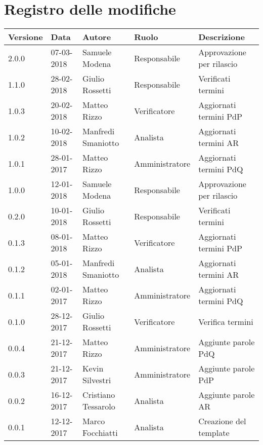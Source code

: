 \documentclass[./AnalisideiRequisiti.tex]{subfiles}
\begin{document}
	
{
	\chapter*{Registro delle modifiche}
\setlength\LTleft{-22mm}
	\begin{longtable}{|p{20mm}|p{20mm}|p{40mm}|p{30mm}|p{50mm}|}
		\hline
		\textbf{Versione} & \textbf{Data} & \textbf{Autore} & \textbf{Ruolo} & \textbf{Descrizione} \\ \hline 
		2.0.0 & 07-03-2018 & Samuele Modena & Responsabile & Approvazione per rilascio\\ \hline
		1.1.0 & 28-02-2018 & Giulio Rossetti & Responsabile & Verificati termini\\ \hline
		
		1.0.3 & 20-02-2018 & Matteo Rizzo & Verificatore & Aggiornati termini PdP\\ \hline
		1.0.2 & 10-02-2018 & Manfredi Smaniotto & Analista & Aggiornati termini AR \\ \hline		
		1.0.1 & 28-01-2017 & Matteo Rizzo & Amministratore & Aggiornati termini PdQ\\
		\hline 
		1.0.0 & 12-01-2018 & Samuele Modena & Responsabile & Approvazione per rilascio\\ \hline
		0.2.0 & 10-01-2018 & Giulio Rossetti & Responsabile & Verificati termini\\ \hline
	
		0.1.3 & 08-01-2018 & Matteo Rizzo & Verificatore & Aggiornati termini PdP\\ \hline
		0.1.2 & 05-01-2018 & Manfredi Smaniotto & Analista & Aggiornati termini AR \\ \hline		
		0.1.1 & 02-01-2017 & Matteo Rizzo & Amministratore & Aggiornati termini PdQ\\ \hline	
	   	0.1.0 & 28-12-2017 & Giulio Rossetti & Verificatore & Verifica termini\\ \hline		
		0.0.4 & 21-12-2017 & Matteo Rizzo & Amministratore & Aggiunte parole PdQ \\ \hline
		0.0.3 & 21-12-2017 & Kevin Silvestri & Amministratore & Aggiunte parole PdP \\ \hline
		0.0.2 & 16-12-2017 & Cristiano Tessarolo & Analista & Aggiunte parole AR\\ \hline
		0.0.1 & 12-12-2017 & Marco Focchiatti & Analista & Creazione del template\\ \hline
	\end{longtable}

}	
\end{document}
